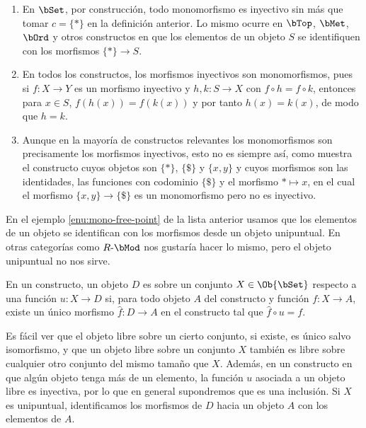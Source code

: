\begin{example}\;
  \begin{enumerate}
  \item \label{enu:mono-free-point} En $\bSet$, por construcción, todo
    monomorfismo es inyectivo sin más que tomar $c=\{*\}$ en la definición
    anterior. Lo mismo ocurre en $\bTop$, $\bMet$, $\bOrd$ y otros constructos
    en que los elementos de un objeto $S$ se identifiquen con los morfismos
    $\{*\}\to S$.
  \item En todos los constructos, los morfismos inyectivos son monomorfismos,
    pues si $f:X\to Y$ es un morfismo inyectivo y $h,k:S\to X$ con
    $f\circ h=f\circ k$, entonces para $x\in S$, $f(h(x))=f(k(x))$ y por tanto
    $h(x)=k(x)$, de modo que $h=k$.
  \item Aunque en la mayoría de constructos relevantes los monomorfismos son
    precisamente los morfismos inyectivos, esto no es siempre así, como muestra
    el constructo cuyos objetos son $\{*\}$, $\{\$\}$ y $\{x,y\}$ y cuyos
    morfismos son las identidades, las funciones con codominio $\{\$\}$ y el
    morfismo $*\mapsto x$, en el cual el morfismo $\{x,y\}\to\{\$\}$ es un
    monomorfismo pero no es inyectivo.
  \end{enumerate}
\end{example}

En el ejemplo \ref{enu:mono-free-point} de la lista anterior usamos que los
elementos de un objeto se identifican con los morfismos desde un objeto
unipuntual. En otras categorías como $R\dash\bMod$ nos gustaría hacer lo mismo,
pero el objeto unipuntual no nos sirve.

\begin{definition}\label{def:free-object}
  En un constructo, un objeto $D$ es  sobre un conjunto
  $X\in\Ob{\bSet}$ respecto a una función $u:X\to D$ si, para todo objeto $A$
  del constructo y función $f:X\to A$, existe un único morfismo $\hat f:D\to A$
  en el constructo tal que $\hat f\circ u = f$.
\end{definition}

Es fácil ver que el objeto libre sobre un cierto conjunto, si existe, es único
salvo isomorfismo, y que un objeto libre sobre un conjunto $X$ también es libre
sobre cualquier otro conjunto del mismo tamaño que $X$. Además, en un constructo
en que algún objeto tenga más de un elemento, la función $u$ asociada a un
objeto libre es inyectiva, por lo que en general supondremos que es una
inclusión. Si $X$ es unipuntual, identificamos los morfismos de $D$ hacia un
objeto $A$ con los elementos de $A$.

